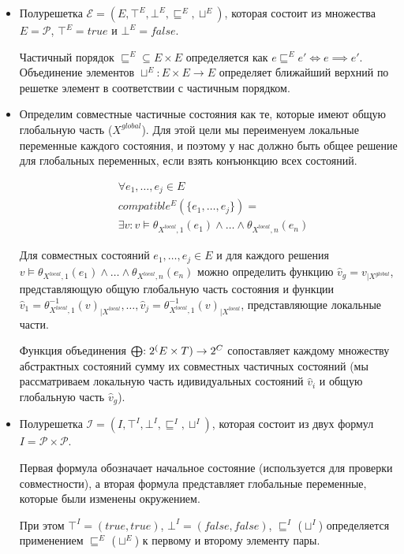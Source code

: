\begin{itemize}
\item Полурешетка
$\mathcal{E}=(E, \top^E, \bot^E, \sqsubseteq^E, \sqcup^E)$, которая состоит из множества
$E = \mathcal{P}$, 
$\top^E = true$ и $\bot^E = false$.

Частичный порядок $\sqsubseteq^E \subseteq E \times E$ определяется как $e \sqsubseteq^E e' \Leftrightarrow e \implies e'$.
Объединение элементов $\sqcup^E: E \times E \to E$ определяет ближайший верхний по решетке элемент в соответствии с частичным порядком.

\item
Определим совместные частичные состояния как те, которые имеют общую глобальную часть ($X^{global}$).
Для этой цели мы переименуем локальные переменные каждого состояния, и поэтому у нас должно быть общее решение для глобальных переменных, если взять конъюнкцию всех состояний.

\begin{equation}
\begin{aligned}
& \forall e_1, \dots, e_j \in E \\
& compatible^E(\{e_1,\dots, e_j\}) = \\
& \exists v: v \models \theta_{X^{local},1}(e_1) \land \dots \land \theta_{X^{local},n}(e_n)
\end{aligned}
\end{equation}

Для совместных состояний $e_1, \dots, e_j \in E$ и для каждого решения 
$v \models \theta_{X^{local},1}(e_1) \land \dots \land \theta_{X^{local},n}(e_n)$
можно определить функцию $\hat v_g = v_{\mid X^{global}}$, представляющую общую глобальную часть состояния и функции $\hat v_1=\theta_{X^{local},1}^{-1}(v)_{\mid X^{local}}, \dots, \hat v_j=\theta_{X^{local},1}^{-1}(v)_{\mid X^{local}}$, представляющие локальные части.

Функция объединения $\mathrel{\bigoplus}: 2^(E \times T) \to 2^C$ сопоставляет каждому множеству абстрактных состояний сумму их совместных частичных состояний (мы рассматриваем локальную часть идивидуальных состояний $\hat v_i$ и общую глобальную часть $\hat v_g$).

\item Полурешетка
$\mathcal{I}=(I, \top^I, \bot^I, \sqsubseteq^I, \sqcup^I)$, которая состоит из двух формул $I=\mathscr{P}\times \mathscr{P}$.

Первая формула обозначает начальное состояние (используется для проверки совместности), а вторая формула представляет глобальные переменные, которые были изменены окружением.

При этом $\top^I=(true,true)$, $\bot^I=(false,false)$, 
$\sqsubseteq^I$ ($\sqcup^I$)  определяется применением  $\sqsubseteq^E$ ($\sqcup^E$) к первому и второму элементу пары.
\end{itemize}

